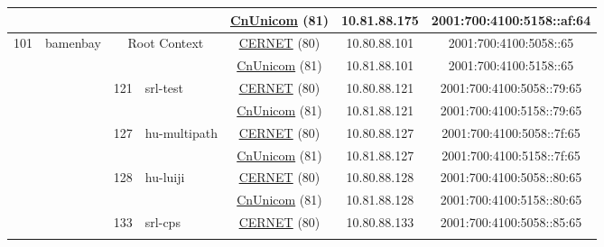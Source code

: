 \begin{small}
\begin{center}
\begin{longtable}{|c|c|c|c|c|c|c|c|}
  &  &  &  & \multicolumn{2}{|c|}{\tiny{\href{http://www.chinaunicom.com}{CnUnicom} (81)}} & \tiny{10.81.88.175} & \tiny{2001:700:4100:5158::af:64} \\ \hline
 \multirow{20}{*}{\tiny{101}} & \multicolumn{1}{|l|}{\multirow{20}{*}{\tiny{bamenbay}}} & \multicolumn{2}{|c|}{\multirow{2}{*}{\tiny{Root Context}}} & \multicolumn{2}{|c|}{\tiny{\href{http://www.cernet.edu.cn}{CERNET} (80)}} & \tiny{10.80.88.101} & \tiny{2001:700:4100:5058::65} \\* \cline{5-5}\cline{6-6}\cline{7-7}\cline{8-8}
  &  & \multicolumn{2}{|c|}{} & \multicolumn{2}{|c|}{\tiny{\href{http://www.chinaunicom.com}{CnUnicom} (81)}} & \tiny{10.81.88.101} & \tiny{2001:700:4100:5158::65} \\* \cline{3-3}\cline{4-4}\cline{5-5}\cline{6-6}\cline{7-7}\cline{8-8}
  &  & \multirow{2}{*}{\tiny{121}} & \multicolumn{1}{|l|}{\multirow{2}{*}{\tiny{srl-test}}} & \multicolumn{2}{|c|}{\tiny{\href{http://www.cernet.edu.cn}{CERNET} (80)}} & \tiny{10.80.88.121} & \tiny{2001:700:4100:5058::79:65} \\* \cline{5-5}\cline{6-6}\cline{7-7}\cline{8-8}
  &  &  &  & \multicolumn{2}{|c|}{\tiny{\href{http://www.chinaunicom.com}{CnUnicom} (81)}} & \tiny{10.81.88.121} & \tiny{2001:700:4100:5158::79:65} \\* \cline{3-3}\cline{4-4}\cline{5-5}\cline{6-6}\cline{7-7}\cline{8-8}
  &  & \multirow{2}{*}{\tiny{127}} & \multicolumn{1}{|l|}{\multirow{2}{*}{\tiny{hu-multipath}}} & \multicolumn{2}{|c|}{\tiny{\href{http://www.cernet.edu.cn}{CERNET} (80)}} & \tiny{10.80.88.127} & \tiny{2001:700:4100:5058::7f:65} \\* \cline{5-5}\cline{6-6}\cline{7-7}\cline{8-8}
  &  &  &  & \multicolumn{2}{|c|}{\tiny{\href{http://www.chinaunicom.com}{CnUnicom} (81)}} & \tiny{10.81.88.127} & \tiny{2001:700:4100:5158::7f:65} \\* \cline{3-3}\cline{4-4}\cline{5-5}\cline{6-6}\cline{7-7}\cline{8-8}
  &  & \multirow{2}{*}{\tiny{128}} & \multicolumn{1}{|l|}{\multirow{2}{*}{\tiny{hu-luiji}}} & \multicolumn{2}{|c|}{\tiny{\href{http://www.cernet.edu.cn}{CERNET} (80)}} & \tiny{10.80.88.128} & \tiny{2001:700:4100:5058::80:65} \\* \cline{5-5}\cline{6-6}\cline{7-7}\cline{8-8}
  &  &  &  & \multicolumn{2}{|c|}{\tiny{\href{http://www.chinaunicom.com}{CnUnicom} (81)}} & \tiny{10.81.88.128} & \tiny{2001:700:4100:5158::80:65} \\* \cline{3-3}\cline{4-4}\cline{5-5}\cline{6-6}\cline{7-7}\cline{8-8}
  &  & \multirow{2}{*}{\tiny{133}} & \multicolumn{1}{|l|}{\multirow{2}{*}{\tiny{srl-cps}}} & \multicolumn{2}{|c|}{\tiny{\href{http://www.cernet.edu.cn}{CERNET} (80)}} & \tiny{10.80.88.133} & \tiny{2001:700:4100:5058::85:65} \\* \cline{5-5}\cline{6-6}\cline{7-7}\cline{8-8}

\end{longtable}
\end{center}
\end{small}
